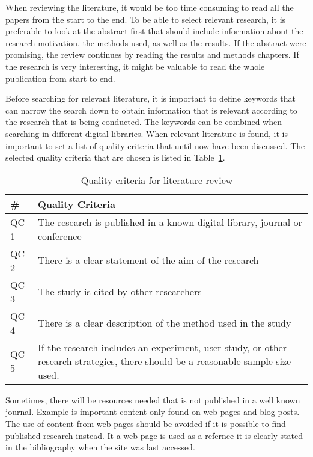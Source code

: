 	    When reviewing the literature, it would be too time consuming to read all the papers from the start to the end. To be able to select relevant research, it is preferable to look at the abstract first that should include information about the research motivation, the methods used, as well as the results. If the abstract were promising, the review continues by reading the results and methods chapters. If the research is very interesting, it might be valuable to read the whole publication from start to end.

	    Before searching for relevant literature, it is important to define keywords that can narrow the search down to obtain information that is relevant according to the research that is being conducted. The keywords can be combined when searching in different digital libraries. When relevant literature is found, it is important to set a list of quality criteria that until now have been discussed.
	    The selected quality criteria that are chosen is listed in Table~\ref{tab:QualityCriteria}.

	      \begin{table}[H]
	        \centering
	        \begin{tabular}{| l | p{10cm} |}
	          \hline
	          {\bf \#} & {\bf Quality Criteria} \\ \hline
	          QC 1 & The research is published in a known digital library, journal or conference\\ \hline
	          QC 2 & There is a clear statement of the aim of the research\\ \hline
	          QC 3 & The study is cited by other researchers\\ \hline
	          QC 4 & There is a clear description of the method used in the study\\ \hline
	          QC 5 & If the research includes an experiment, user study, or other research strategies, there should be a reasonable sample size used. \\ \hline
	        \end{tabular}
	        \caption{Quality criteria for literature review}
	        \label{tab:QualityCriteria}
	      \end{table}

	    Sometimes, there will be resources needed that is not published in a well known journal. Example is important content only found on web pages and blog posts. The use of content from web pages should be avoided if it is possible to find published research instead. It a web page is used as a refernce it is clearly stated in the bibliography when the site was last accessed. 


